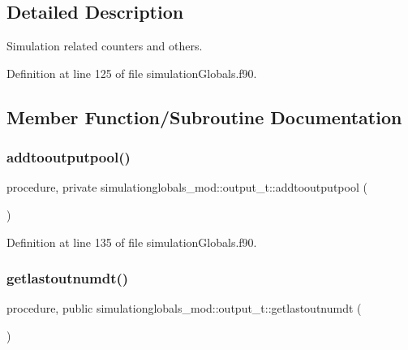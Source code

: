 \subsection{Detailed Description}
Simulation related counters and others. 

Definition at line 125 of file simulation\+Globals.\+f90.



\subsection{Member Function/\+Subroutine Documentation}
\mbox{\label{structsimulationglobals__mod_1_1output__t_a8502a713450f398f59c6bab67ed6cde9}} 
\subsubsection{\texorpdfstring{addtooutputpool()}{addtooutputpool()}}
{\footnotesize\ttfamily procedure, private simulationglobals\+\_\+mod\+::output\+\_\+t\+::addtooutputpool (\begin{DoxyParamCaption}{ }\end{DoxyParamCaption})\hspace{0.3cm}{\ttfamily [private]}}



Definition at line 135 of file simulation\+Globals.\+f90.

\mbox{\label{structsimulationglobals__mod_1_1output__t_af0af2c64c363c711d7c26cdd03cde406}} 
\subsubsection{\texorpdfstring{getlastoutnumdt()}{getlastoutnumdt()}}
{\footnotesize\ttfamily procedure, public simulationglobals\+\_\+mod\+::output\+\_\+t\+::getlastoutnumdt (\begin{DoxyParamCaption}{ }\end{DoxyParamCaption})}



